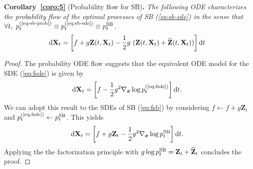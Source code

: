 \documentclass{article}
\def\eqref#1{(\ref{#1})}
\def\rd{{\textnormal{d}}}
\def\rvX{{\mathbf{X}}}
\def\rvZ{{\mathbf{Z}}}
\def\vx{{\bm{x}}}
\def\dt{{ \mathrm{d} t }}
\newcommand{\br}[1]{\left[#1\right]}
\begin{document}
 
\textbf{Corollary~\ref{coro:5}} (Probability flow for SB)\textbf{.}
  \textit{
  The following ODE
  characterizes the probability flow of the optimal processes of SB \eqref{eq:sb-sde}
  in the sense that $\forall t,~\pp{t}{\eqref{eq-sb-prob}} \equiv \pp{t}{\eqref{eq:sb-sde}} \equiv \pp{t}{SB}$.}
  \begin{align}
    {\rd \rvX_t = \br{f + g\rvZ(t, \rvX_t) -\frac{1}{2}g~(\rvZ(t, \rvX_t) + \widehat{\rvZ}(t, \rvX_t))} \dt}
    \label{eq:app-sb-prob2}
  \end{align}
\begin{proof}
  The probability ODE flow \citep{song2020score,maoutsa2020interacting} suggests that
  the equivalent ODE model for the SDE \eqref{eq:fsde} is given by
  \begin{align*}
    \rd \rvX_t = \br{f - \frac{1}{2} g^2 \nabla_\vx \log \pp{t}{\eqref{eq:fsde}} } \dt.
  \end{align*}
  We can adopt this result to the SDEs of SB \eqref{eq:fsb} by considering
  $f \leftarrow f + g \rvZ_t$ and $\pp{t}{\eqref{eq:fsde}} \leftarrow \pp{t}{SB}$.
  This yields
  \begin{align}
    \rd \rvX_t = \br{f + g \rvZ_t - \frac{1}{2} g^2\nabla_\vx \log\pp{t}{SB}} \dt.
    \label{eq:app-ode}
  \end{align}
  Applying the the factorization principle \citep{chen2021stochastic} with
  $g\log\pp{t}{SB} = \rvZ_t + \widehat{\rvZ}_t$ concludes the proof.
\end{proof}
\end{document}
